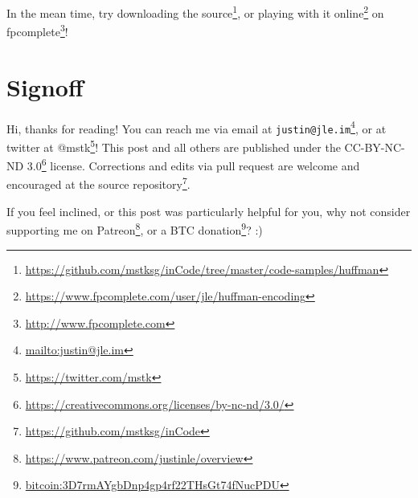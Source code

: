 \documentclass[]{article}
\renewcommand{\href}[2]{#2\footnote{\url{#1}}}
\begin{document}
In the mean time, try
\href{https://github.com/mstksg/inCode/tree/master/code-samples/huffman}{downloading
the source}, or
\href{https://www.fpcomplete.com/user/jle/huffman-encoding}{playing with it
online} on \href{http://www.fpcomplete.com}{fpcomplete}!

\hypertarget{signoff}{%
\section{Signoff}\label{signoff}}

Hi, thanks for reading! You can reach me via email at
\href{mailto:justin@jle.im}{\nolinkurl{justin@jle.im}}, or at twitter at
\href{https://twitter.com/mstk}{@mstk}! This post and all others are published
under the \href{https://creativecommons.org/licenses/by-nc-nd/3.0/}{CC-BY-NC-ND
3.0} license. Corrections and edits via pull request are welcome and encouraged
at \href{https://github.com/mstksg/inCode}{the source repository}.

If you feel inclined, or this post was particularly helpful for you, why not
consider \href{https://www.patreon.com/justinle/overview}{supporting me on
Patreon}, or a \href{bitcoin:3D7rmAYgbDnp4gp4rf22THsGt74fNucPDU}{BTC donation}?
:)
\end{document}
